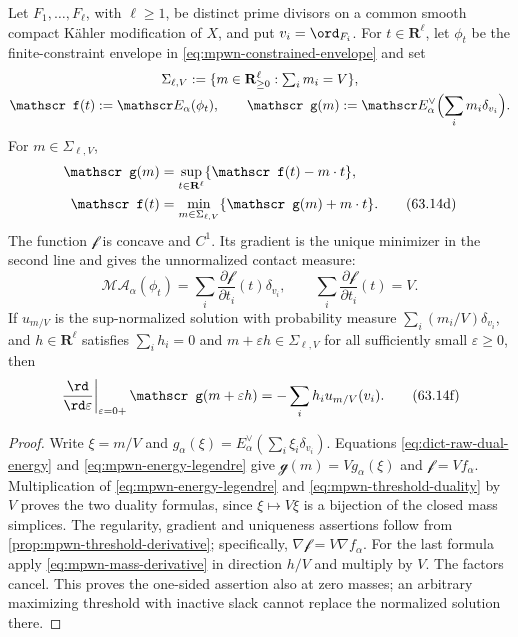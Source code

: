 \noindent\begin{minipage}{\linewidth}
\begin{proposition}\label{prop:dict-contact-mass-normalization}
Let $F_1,\ldots,F_\ell$, with $\ell\geq1$, be distinct prime divisors on a common smooth compact K\"ahler modification of $X$, and put $v_i=\ord_{F_i}$. For $t\in\mathbf R^\ell$, let $\phi_t$ be the finite-constraint envelope in \eqref{eq:mpwn-constrained-envelope} and set
\[
 \begin{gathered}
 \Sigma_{\ell,V}:=\{m\in\mathbf R_{\geq0}^\ell:\textstyle\sum_i m_i=V\},\\
 \mathscr f(t):=\mathscr E_\alpha(\phi_t),\qquad
 \mathscr g(m):=\mathscr E_\alpha^\vee
                          \Bigl(\sum_i m_i\delta_{v_i}\Bigr).
 \end{gathered}
\]
For $m\in\Sigma_{\ell,V}$,
\begin{align}
 \mathscr g(m)&=\sup_{t\in\mathbf R^\ell}
                         \{\mathscr f(t)-m\cdot t\},\notag\\
 \mathscr f(t)&=\min_{m\in\Sigma_{\ell,V}}
                         \{\mathscr g(m)+m\cdot t\}.
\tag{63.14d}\label{eq:dict-raw-legendre-duality}
\end{align}
The function $\mathscr f$ is concave and $C^1$. Its gradient is the unique minimizer in the second line and gives the unnormalized contact measure:
\[
 \mathscr{MA}_\alpha(\phi_t)
       =\sum_i\frac{\partial\mathscr f}{\partial t_i}(t)\delta_{v_i},
 \qquad
 \sum_i\frac{\partial\mathscr f}{\partial t_i}(t)=V.
\tag{63.14e}\label{eq:dict-raw-contact-gradient}
\]
If $u_{m/V}$ is the sup-normalized solution with probability measure $\sum_i(m_i/V)\delta_{v_i}$, and $h\in\mathbf R^\ell$ satisfies $\sum_i h_i=0$ and $m+\varepsilon h\in\Sigma_{\ell,V}$ for all sufficiently small $\varepsilon\geq0$, then
\[
 \left.\frac{\rd}{\rd\varepsilon}\right|_{\varepsilon=0+}
        \mathscr g(m+\varepsilon h)
             =-\sum_i h_i u_{m/V}(v_i).
\tag{63.14f}\label{eq:dict-raw-mass-derivative}
\]
\end{proposition}
\end{minipage}

\begin{proof}
Write $\xi=m/V$ and $g_\alpha(\xi)=E_\alpha^\vee(\sum_i\xi_i\delta_{v_i})$. Equations \eqref{eq:dict-raw-dual-energy} and \eqref{eq:mpwn-energy-legendre} give $\mathscr g(m)=Vg_\alpha(\xi)$ and $\mathscr f=Vf_\alpha$. Multiplication of \eqref{eq:mpwn-energy-legendre} and \eqref{eq:mpwn-threshold-duality} by $V$ proves the two duality formulas, since $\xi\mapsto V\xi$ is a bijection of the closed mass simplices. The regularity, gradient and uniqueness assertions follow from \cref{prop:mpwn-threshold-derivative}; specifically, $\nabla\mathscr f=V\nabla f_\alpha$. For the last formula apply \eqref{eq:mpwn-mass-derivative} in direction $h/V$ and multiply by $V$. The factors cancel. This proves the one-sided assertion also at zero masses; an arbitrary maximizing threshold with inactive slack cannot replace the normalized solution there.
\end{proof}

